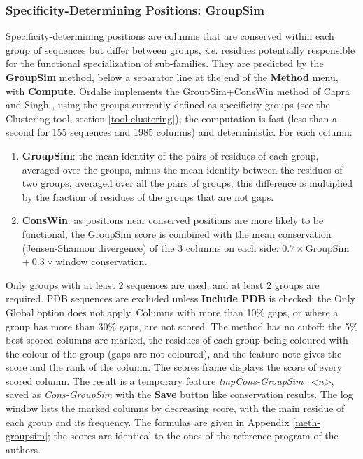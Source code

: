 \documentclass[a4paper]{article}
\begin{document}
\subsubsection{Specificity-Determining Positions: GroupSim}
\label{tool-groupsim}
Specificity-determining positions are columns that are conserved within each group of sequences but differ between groups, \emph{i.e.} residues potentially responsible for the functional specialization of sub-families. They are predicted by the \textbf{GroupSim} method, below a separator line at the end of the \textbf{Method} menu, with \textbf{Compute}. Ordalie implements the GroupSim+ConsWin method of Capra and Singh \cite{groupsim}, using the groups currently defined as specificity groups (see the Clustering tool, section \ref{tool-clustering}); the computation is fast (less than a second for 155 sequences and 1985 columns) and deterministic. For each column:
\begin{enumerate}
    \item \textbf{GroupSim}: the mean identity of the pairs of residues of each group, averaged over the groups, minus the mean identity between the residues of two groups, averaged over all the pairs of groups; this difference is multiplied by the fraction of residues of the groups that are not gaps.
    \item \textbf{ConsWin}: as positions near conserved positions are more likely to be functional, the GroupSim score is combined with the mean conservation (Jensen-Shannon divergence) of the 3 columns on each side: $0.7\times$GroupSim $+\ 0.3\times$window conservation.
\end{enumerate}
Only groups with at least 2 sequences are used, and at least 2 groups are required. PDB sequences are excluded unless \textbf{Include PDB} is checked; the Only Global option does not apply. Columns with more than 10\% gaps, or where a group has more than 30\% gaps, are not scored. The method has no cutoff: the 5\% best scored columns are marked, the residues of each group being coloured with the colour of the group (gaps are not coloured), and the feature note gives the score and the rank of the column. The scores frame displays the score of every scored column. The result is a temporary feature \textit{tmpCons-GroupSim\_<n>}, saved as \textit{Cons-GroupSim} with the \textbf{Save} button like conservation results. The log window lists the marked columns by decreasing score, with the main residue of each group and its frequency. The formulas are given in Appendix \ref{meth-groupsim}; the scores are identical to the ones of the reference program of the authors.
\end{document}
